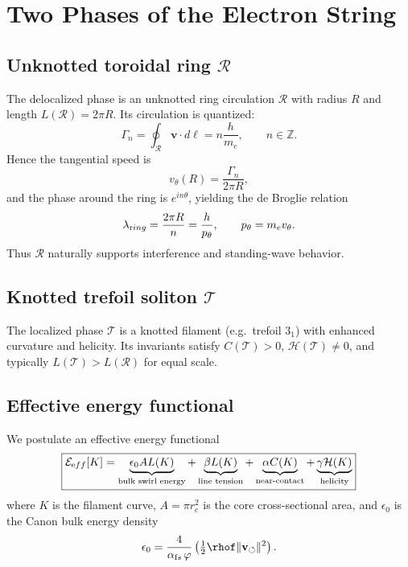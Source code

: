 \documentclass[11pt,a4paper]{article}
\begin{document}
\section{Two Phases of the Electron String}

    \subsection{Unknotted toroidal ring $\mathcal R$}

        The delocalized phase is an unknotted ring circulation $\mathcal R$
        with radius $R$ and length $L(\mathcal R)=2\pi R$.
        Its circulation is quantized:
        \begin{equation}
        \Gamma_n = \oint_{\mathcal R} \mathbf v \cdot d\boldsymbol \ell = n \frac{h}{m_e}, \qquad n\in \mathbb Z .
        \end{equation}
        Hence the tangential speed is
        \begin{equation}
        v_\theta(R) = \frac{\Gamma_n}{2\pi R},
        \end{equation}
        and the phase around the ring is $e^{i n\theta}$, yielding the
        de Broglie relation
        \begin{equation}
        \lambda_{\textrm ring} = \frac{2\pi R}{n} = \frac{h}{p_\theta}, \qquad p_\theta = m_e v_\theta .
        \end{equation}
        Thus $\mathcal R$ naturally supports interference and standing-wave behavior.

    \subsection{Knotted trefoil soliton $\mathcal T$}

        The localized phase $\mathcal T$ is a knotted filament
        (e.g.\ trefoil $3_1$) with enhanced curvature and helicity.
        Its invariants satisfy $C(\mathcal T)>0$, $\mathcal H(\mathcal T)\neq 0$,
        and typically $L(\mathcal T)>L(\mathcal R)$ for equal scale.

    \subsection{Effective energy functional}

        We postulate an effective energy functional
        \begin{equation}
        \boxed{
            \mathcal E_{\textrm eff}[K] =
            \underbrace{\epsilon_0 A L(K)}_{\text{bulk swirl energy}} +
            \underbrace{\beta L(K)}_{\text{line tension}} +
            \underbrace{\alpha C(K)}_{\text{near-contact}} +
            \underbrace{\gamma \mathcal H(K)}_{\text{helicity}}
        }
        \end{equation}
        where $K$ is the filament curve,
        $A=\pi r_c^2$ is the core cross-sectional area,
        and $\epsilon_0$ is the Canon bulk energy density
        \begin{equation}
        \epsilon_0 = \frac{4}{\alpha_{\textrm fs}\,\varphi}\left(\tfrac12 \rhof \|\mathbf v_{\circlearrowleft}\|^2\right).
        \end{equation}
\end{document}
